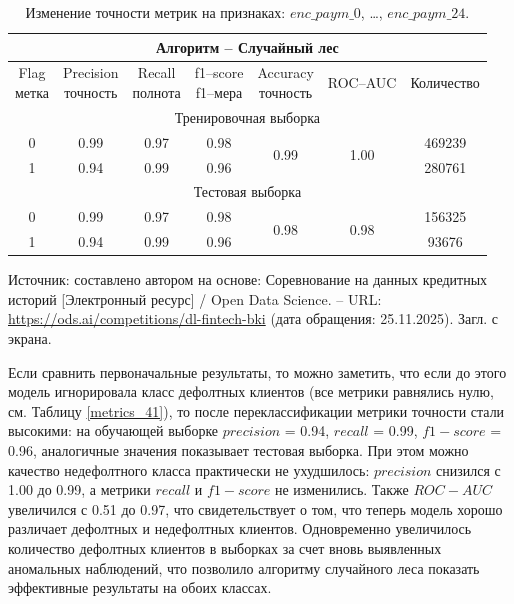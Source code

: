 \begin{center}
  \begin{longtable}{|c|c|c|c|c|c|c|}
    \caption{Изменение точности метрик на признаках: $enc\_paym\_0$, \dots, $enc\_paym\_24$.}
    \label{metrics_after_rfc} \\
    \hline
    \multicolumn{7}{|c|}{Алгоритм -- Случайный лес}\\
    \hline
    \rowcolor[gray]{.9}
    \specialcell{Flag\\метка} &
    \specialcell{Precision\\точность} &
    \specialcell{Recall\\полнота} &
    \specialcell{f1--score\\f1--мера} &
    \specialcell{Accuracy\\точность}  &
    ROC--AUC &
    Количество    \\
    \hline
    \multicolumn{7}{|c|}{Тренировочная выборка}\\
    \hline
    0 & 0.99 & 0.97 & 0.98 &
    \multirow{2}{*}{0.99} &   
    \multirow{2}{*}{1.00} &  
    469239 \\                    
    \cline{1-4} \cline{7-7}
    1 & 0.94 & 0.99 & 0.96 &  
      &      & 280761 \\       
    \hline
    \multicolumn{7}{|c|}{Тестовая выборка} \\
    \hline
    0 & 0.99 & 0.97 & 0.98 &
    \multirow{2}{*}{0.98} &
    \multirow{2}{*}{0.98} &
    156325 \\
    \cline{1-4} \cline{7-7}
    1 & 0.94 & 0.99 & 0.96 & & & 93676 \\
    \hline
  \end{longtable}
  \begin{minipage}{\textwidth}
    \fontsize{9}{11}\selectfont
    \justifying
    Источник: составлено автором на основе: Соревнование на данных кредитных историй [Электронный ресурс] / Open Data Science. -- URL: \url{https://ods.ai/competitions/dl-fintech-bki} (дата обращения: 25.11.2025). Загл. с экрана.
  \end{minipage}
\end{center}

Если сравнить первоначальные результаты, то можно заметить, что если до этого модель игнорировала класс дефолтных клиентов (все метрики равнялись нулю, см. Таблицу \ref{metrics_41}), то после переклассификации метрики точности стали высокими: на обучающей выборке $precision$ = 0.94, $recall$ = 0.99, $f1-score$ = 0.96, аналогичные значения показывает тестовая выборка. При этом можно качество недефолтного класса практически не ухудшилось: $precision$ снизился с 1.00 до 0.99, а метрики $recall$ и $f1-score$ не изменились. Также $ROC-AUC$ увеличился с 0.51 до 0.97, что свидетельствует о том, что теперь модель хорошо различает дефолтных и недефолтных клиентов. Одновременно увеличилось количество дефолтных клиентов в выборках за счет вновь выявленных аномальных наблюдений, что позволило алгоритму случайного леса показать эффективные результаты на обоих классах. 

